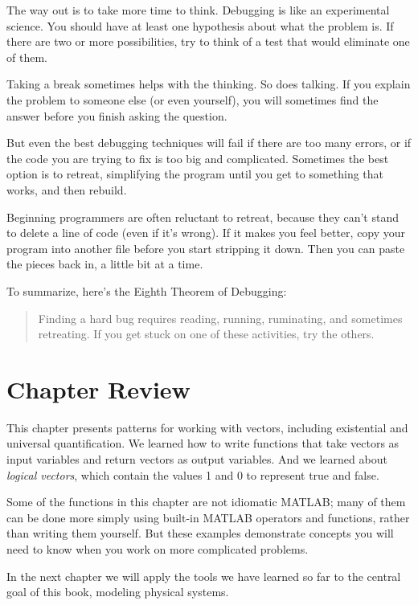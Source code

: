
The way out is to take more time to think.  Debugging is like an
experimental science.  You should have at least one hypothesis about
what the problem is.  If there are two or more possibilities, try to
think of a test that would eliminate one of them.


Taking a break sometimes helps with the thinking.  So does talking.
If you explain the problem to someone else (or even yourself), you
will sometimes find the answer before you finish asking the question.

But even the best debugging techniques will fail if there are too many
errors, or if the code you are trying to fix is too big and
complicated.  Sometimes the best option is to retreat, simplifying the
program until you get to something that works, and then rebuild.

Beginning programmers are often reluctant to retreat, because
they can't stand to delete a line of code (even if it's wrong).
If it makes you feel better, copy your program into another file
before you start stripping it down.  Then you can paste the pieces
back in, a little bit at a time.


To summarize, here's the Eighth Theorem of Debugging:

\begin{quote}
Finding a hard bug requires reading, running, ruminating,
and sometimes retreating.  If you get stuck on one of these
activities, try the others.
\end{quote}

\section{Chapter Review}

This chapter presents patterns for working with vectors, including existential and universal quantification.
We learned how to write functions that take vectors as input variables and return vectors as output variables.
And we learned about {\em logical vectors}, which contain the values 1 and 0 to represent true and false.

Some of the functions in this chapter are not idiomatic MATLAB; many of them can be done more simply using built-in MATLAB operators and functions, rather than writing them yourself.  But these examples demonstrate concepts you will need to know when you work on more complicated problems.

In the next chapter we will apply the tools we have learned so far to the central goal of this book, modeling physical systems.





